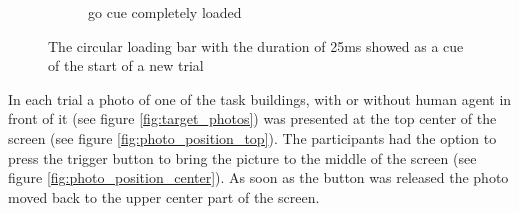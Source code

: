\begin{figure}[h!]
\begin{subfigure}[b]{0.3\linewidth}
		\caption{go cue completely loaded}
		\label{fig:go_cue_full}
	\end{subfigure}
	
	\caption[Start of trial cue]{The circular loading bar with the duration of 25ms showed as a cue of the start of a new trial
	}
	\label{fig:go_cue}
\end{figure}

In each trial a photo of one of the task buildings, with or without human agent in front of it (see figure \ref{fig:target_photos}) was presented at the top center of the screen (see figure \ref{fig:photo_position_top}). The participants had the option to press the trigger button to bring the picture to the middle of the screen (see figure \ref{fig:photo_position_center}). As soon as the button was released the photo moved back to the upper center part of the screen.

